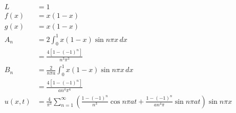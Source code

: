 \documentclass{article}
\begin{document}
\setcounter{subsubsection}{4}
\subsubsection{}

\begin{align*}
  L       & = 1                                                                                                                                                   \\
  f(x)    & = x (1 - x)                                                                                                                                           \\
  g(x)    & = x (1 - x)                                                                                                                                           \\
  A_n     & = 2 \int_0^1 x (1 - x) \sin n \pi x \,d x                                                                                                             \\
          & = \frac{4 [1 - (-1)^n]}{n^3 \pi^3}                                                                                                                    \\
  B_n     & = \frac{2}{n \pi a} \int_0^1 x (1 - x) \sin n \pi x \,d x                                                                                             \\
          & = \frac{4 [1 - (-1)^n]}{a n^4 \pi^4}                                                                                                                  \\
  u(x, t) & = \frac{4}{\pi^3} \sum_{n = 1}^\infty \left( \frac{1 - (-1)^n}{n^3} \cos n \pi a t + \frac{1 - (-1)^n}{a n^4 \pi} \sin n \pi a t \right) \sin n \pi x
\end{align*}

\setcounter{subsubsection}{6}
\subsubsection{}
\end{document}
